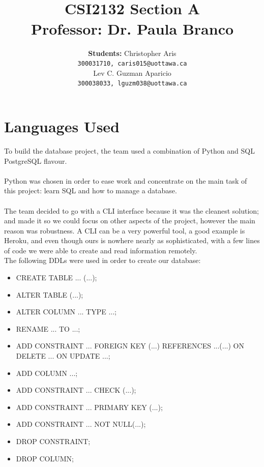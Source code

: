 \documentclass[12pt, lettersize]{article}
\title{\Large \centering{Database Project  } \\ \large \textbf{ CSI2132 Section A \\  Professor: Dr. Paula Branco} }
\author{ \large \textbf{Students:} Christopher Aris \\ 
	\texttt{300031710, caris015@uottawa.ca} \\
	Lev C. Guzman Aparicio \\
	\texttt{300038033, lguzm038@uottawa.ca}
	}
\theoremstyle{Remark}
\begin{document}
	\begin{titlepage}
		\maketitle
	\end{titlepage}

	\section{Languages Used}
	
	To build the database project, the team used a combination of Python and SQL PostgreSQL flavour.\\\\
	Python was chosen in order to ease work and concentrate on the main task of this project: learn SQL and how to manage a database.\\ \\
	The team decided to go with a CLI interface because it was the cleanest solution; and made it so we could focus on other aspects of the project, however the main reason was robustness. A CLI can be a very powerful tool, a good example is Heroku, and even though ours is nowhere nearly as sophisticated, with a few lines of code we were able to create and read information remotely.\\
	
	The following DDLs were used in order to create our database:
	
	\begin{itemize}
		
		\item CREATE TABLE ... (...);
		
		\item ALTER TABLE (...);
		
		\item  ALTER COLUMN ... TYPE ...;
		
		\item RENAME ... TO ...;
		
		\item ADD CONSTRAINT ... FOREIGN KEY (...) REFERENCES ...(...) ON DELETE ... ON UPDATE ...;
		
		\item ADD COLUMN ...;
		
		\item ADD CONSTRAINT ... CHECK (...);
		
		\item ADD CONSTRAINT ... PRIMARY KEY (...);
		
		\item  ADD CONSTRAINT ... NOT NULL(...);
		
		\item DROP CONSTRAINT;
		
		\item DROP COLUMN;
		
	\end{itemize}
\end{document}
